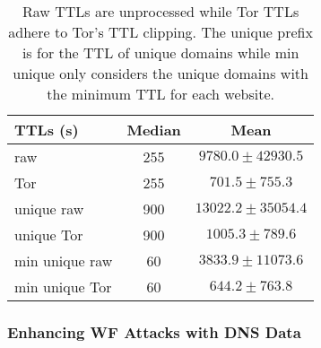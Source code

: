 \begin{table}[t]
	\centering
	\begin{tabular}{l c c}
	\toprule
	\textbf{TTLs (s)} & \textbf{Median} & \textbf{Mean} \\
	\midrule
	raw & 255 & $9780.0\pm42930.5$ \\ %
	Tor & 255 & $701.5\pm755.3$ \\ %
	unique raw & 900 & $13022.2\pm35054.4$ \\ %
	unique Tor & 900 & $1005.3\pm789.6$ \\ %
	min unique raw & 60 & $3833.9\pm11073.6$ \\ %
	min unique Tor & 60 & $644.2\pm763.8$ \\ %
	\bottomrule
	\end{tabular}
	\caption{%
	Raw TTLs are unprocessed while Tor TTLs adhere to Tor's TTL clipping.
	The unique prefix is for the TTL of unique domains while min unique only
	considers the unique domains with the minimum TTL for each website.}
	\label{tab:daw-ttls}
\end{table}


\subsubsection{Enhancing WF Attacks with DNS Data}


